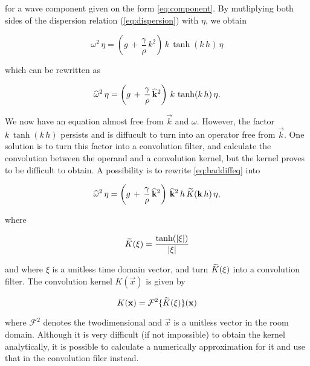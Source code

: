 for a wave component given on the form \ref{eq:component}. By mutliplying both sides of the dispersion relation (\ref{eq:dispersion}) with $\eta$, we obtain

\begin{equation}
\omega^2\,\eta = \left(g\,+\,\frac{\gamma}{\rho}\,k^2\right)\,k\,\tanh(k\,h)\,\eta
\end{equation}

which can be rewritten as

\begin{equation} \label{eq:baddiffeq}
\widehat{\omega}^2\,\eta = \left(g\,+\,\frac{\gamma}{\rho}\,{\widehat{\mathbf{k}}}^2\right)\,k\,\tanh(k\,h)\,\eta.
\end{equation}

We now have an equation almost free from $\vec{k}$ and $\omega$. However, the factor $k\,\tanh(k\,h)$ persists and is diffucult to turn into an operator free from $\vec{k}$. One solution is to turn this factor into a convolution filter, and calculate the convolution between the operand and a convolution kernel, but the kernel proves to be difficult to obtain. A possibility is to rewrite \ref{eq:baddiffeq} into

\begin{equation} \label{eq:betterdiffeq}
\widehat{\omega}^2\,\eta = \left(g\,+\,\frac{\gamma}{\rho}\,{\widehat{\mathbf{k}}}^2\right)\,{\widehat{\mathbf{k}}}^2\,h\,\widetilde{K}(\mathbf{k}\,h)\,\eta,
\end{equation}

where

\begin{equation} %
\ftrans{K}(\vec{\xi}) = \frac{\tanh(|\vec{\xi}|)}{|\vec{\xi}|}
\end{equation}

and where $\xi$ is a unitless time domain vector, and turn $\widetilde{K}(\mathbf{\xi})$ into a convolution filter. The convolution kernel $K(\vec{x})$ is given by

\begin{equation} \label{eq:kernelfour2d}
K(\mathbf{x}) = \mathcal{F}^2\{\widetilde{K}(\mathbf{\xi})\}(\mathbf{x})
\end{equation}

where $\mathcal{F}^2$ denotes the twodimensional  and $\vec{x}$ is a unitless vector in the room domain. Although it is very difficult (if not impossible) to obtain the kernel analytically, it is possible to calculate a numerically approximation for it and use that in the convolution filer instead.

